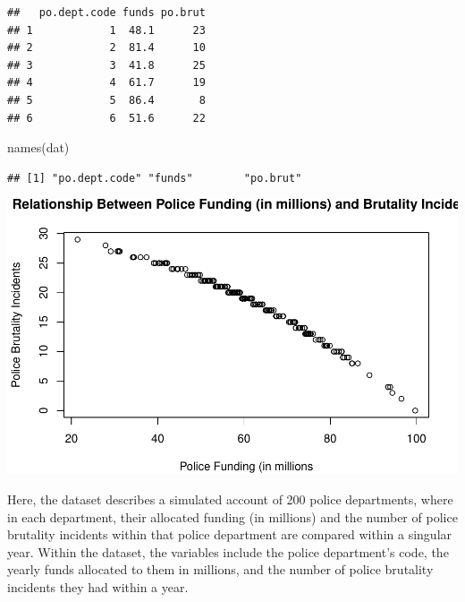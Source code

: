 \documentclass[
]{article}
\newenvironment{Shaded}{\begin{snugshade}}{\end{snugshade}}
\newcommand{\AttributeTok}[1]{\textcolor[rgb]{0.77,0.63,0.00}{#1}}
\newcommand{\FunctionTok}[1]{\textcolor[rgb]{0.00,0.00,0.00}{#1}}
\newcommand{\NormalTok}[1]{#1}
\newcommand{\SpecialCharTok}[1]{\textcolor[rgb]{0.00,0.00,0.00}{#1}}
\newcommand{\StringTok}[1]{\textcolor[rgb]{0.31,0.60,0.02}{#1}}
\begin{document}
\begin{verbatim}
##   po.dept.code funds po.brut
## 1            1  48.1      23
## 2            2  81.4      10
## 3            3  41.8      25
## 4            4  61.7      19
## 5            5  86.4       8
## 6            6  51.6      22
\end{verbatim}

\begin{Shaded}
\begin{Highlighting}[]
\FunctionTok{names}\NormalTok{(dat)}
\end{Highlighting}
\end{Shaded}

\begin{verbatim}
## [1] "po.dept.code" "funds"        "po.brut"
\end{verbatim}

\begin{Shaded}
\end{Shaded}

\includegraphics{Journal_files/figure-latex/unnamed-chunk-41-1.pdf}

Here, the dataset describes a simulated account of 200 police
departments, where in each department, their allocated funding (in
millions) and the number of police brutality incidents within that
police department are compared within a singular year. Within the
dataset, the variables include the police department's code, the yearly
funds allocated to them in millions, and the number of police brutality
incidents they had within a year.
\end{document}
